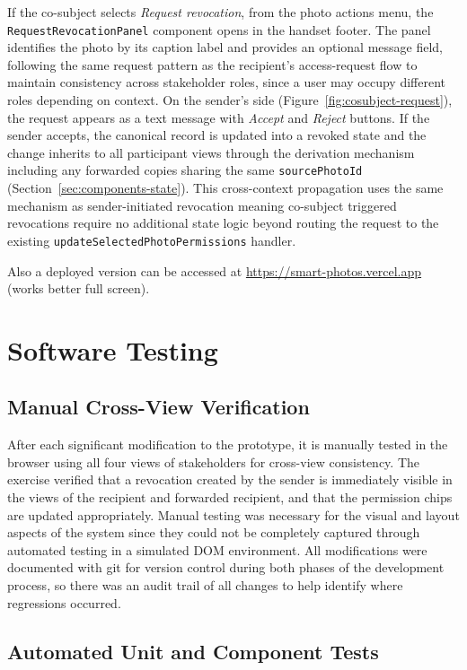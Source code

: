 If the co-subject selects \emph{Request revocation}, from the photo actions menu, the \texttt{RequestRevocationPanel} component opens in the handset footer. The panel identifies the photo by its caption label and provides an optional message field, following the same request pattern as the recipient’s access-request flow to maintain consistency across stakeholder roles, since a user may occupy different roles depending on context. On the sender's side (Figure~\ref{fig:cosubject-request}), the request appears as a text message with \emph{Accept} and \emph{Reject} buttons. If the sender accepts, the canonical record is updated into a revoked state and the change inherits to all participant views through the derivation mechanism  including any forwarded copies sharing the same \texttt{sourcePhotoId} (Section~\ref{sec:components-state}). This cross-context propagation uses the same mechanism as sender-initiated revocation meaning co-subject triggered revocations require no additional state logic beyond routing the request to the existing \texttt{updateSelectedPhotoPermissions} handler.


Also a deployed version can be accessed at \url{https://smart-photos.vercel.app} (works better full screen).

\section{Software Testing}\label{sec:software-testing}

\subsection*{Manual Cross-View Verification}

After each significant modification to the prototype, it is manually tested in the browser using all four views of stakeholders for cross-view consistency. The exercise verified that a revocation created by the sender is immediately visible in the views of the recipient and forwarded recipient, and that the permission chips are updated appropriately. Manual testing was necessary for the visual and layout aspects of the system since they could not be completely captured through automated testing in a simulated DOM environment. All modifications were documented  with git for version control during both phases of the development process, so there was an audit trail of all changes to help identify where regressions occurred.


\subsection*{Automated Unit and Component Tests}

